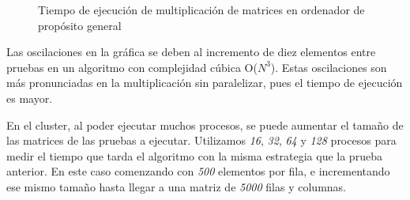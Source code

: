 		\begin{figure}[!h]
		\centering
		\caption{Tiempo de ejecución de multiplicación de matrices en ordenador de propósito general}
		\label{fig:mult_matrices}
		\end{figure}
		
		
		
		\newpage
		
		Las oscilaciones en la gráfica se deben al incremento de diez elementos entre pruebas en un algoritmo con complejidad cúbica O($N^{3}$). Estas oscilaciones son más pronunciadas en la multiplicación sin paralelizar, pues el tiempo de ejecución es mayor.
		
		En el cluster, al poder ejecutar muchos procesos, se puede aumentar el tamaño de las matrices de las pruebas a ejecutar. Utilizamos \textit{16}, \textit{32}, \textit{64} y \textit{128} procesos para medir el tiempo que tarda el algoritmo con la misma estrategia que la prueba anterior. En este caso comenzando con \textit{500} elementos por fila, e incrementando ese mismo tamaño hasta llegar a una matriz de \textit{5000} filas y columnas. 
				

